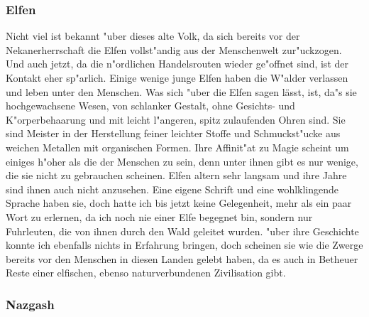 \documentclass[a5paper,8pt]{book}
\begin{document}
\newpage

\subsubsection{Elfen}

Nicht viel ist bekannt "uber dieses alte Volk, da sich bereits vor der Nekanerherrschaft die Elfen vollst"andig aus der Menschenwelt zur"uckzogen. Und auch jetzt, da die n"ordlichen Handelsrouten wieder ge"offnet sind, ist der Kontakt eher sp"arlich. Einige wenige junge Elfen haben die W"alder verlassen und leben unter den Menschen. Was sich "uber die Elfen sagen lässt, ist, da"s sie  hochgewachsene Wesen, von schlanker Gestalt, ohne Gesichts- und K"orperbehaarung und mit leicht l"angeren, spitz zulaufenden Ohren sind. Sie sind Meister in der Herstellung feiner leichter Stoffe und Schmuckst"ucke aus weichen Metallen mit organischen Formen.  Ihre Affinit"at zu Magie scheint um einiges h"oher als die der Menschen zu sein, denn unter ihnen gibt es nur wenige, die sie nicht zu gebrauchen scheinen. Elfen altern sehr langsam und ihre Jahre sind ihnen auch nicht anzusehen. Eine eigene Schrift und eine wohlklingende Sprache haben sie, doch hatte ich bis jetzt keine Gelegenheit, mehr als ein paar Wort zu 
erlernen, da ich noch nie einer Elfe begegnet bin, sondern nur Fuhrleuten, die von ihnen durch den Wald geleitet wurden. "uber ihre Geschichte konnte ich ebenfalls nichts in Erfahrung bringen, doch scheinen sie wie die Zwerge bereits vor den Menschen in diesen Landen gelebt haben, da es auch in Betheuer Reste einer elfischen, ebenso naturverbundenen Zivilisation gibt. 

\newpage

\subsubsection{Nazgash}
\end{document}
